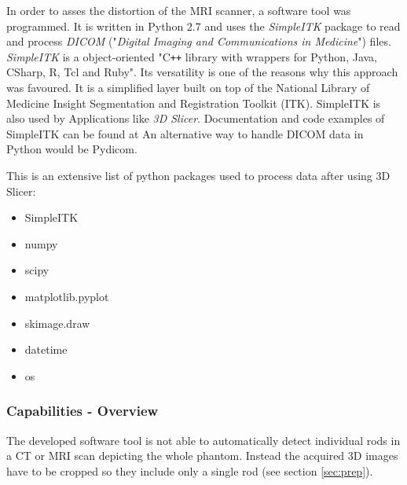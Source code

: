 In order to asses the distortion of the MRI scanner, a software tool was programmed.
It is written in Python 2.7 and uses the \textit{SimpleITK} package to read and process \textit{DICOM} ("\textit{Digital Imaging and Communications in Medicine}") files. \cite{Python, DICOM}
\textit{SimpleITK} is a object-oriented "C\texttt{++} library with wrappers for Python, Java, CSharp, R, Tcl and Ruby". \cite{SimpleITK, SimpleITK_started} Its versatility is one of the reasons why this approach was favoured.
It is a simplified layer built on top of the National Library of Medicine Insight Segmentation and Registration Toolkit (ITK). SimpleITK is also used by Applications like \textit{3D Slicer}.
Documentation and code examples of SimpleITK can be found at \cite{InsightSoftwareConsortium, Kyriakou-SimpleITK}
An alternative way to handle DICOM data in Python would be Pydicom. \cite{Pydicom, Kyriakou-Pydicom-VTK} 

This is an extensive list of python packages used to process data after using 3D Slicer:
\begin{itemize}
 \item SimpleITK
 \item numpy
 \item scipy
 \item matplotlib.pyplot \cite{Hunter2007}
 \item skimage.draw
 \item datetime
 \item os
\end{itemize}


\subsubsection{Capabilities - Overview}

The developed software tool is not able to automatically detect individual rods in a CT or MRI scan depicting the whole phantom.
Instead the acquired 3D images have to be cropped so they include only a single rod (see section \ref{sec:prep}).

